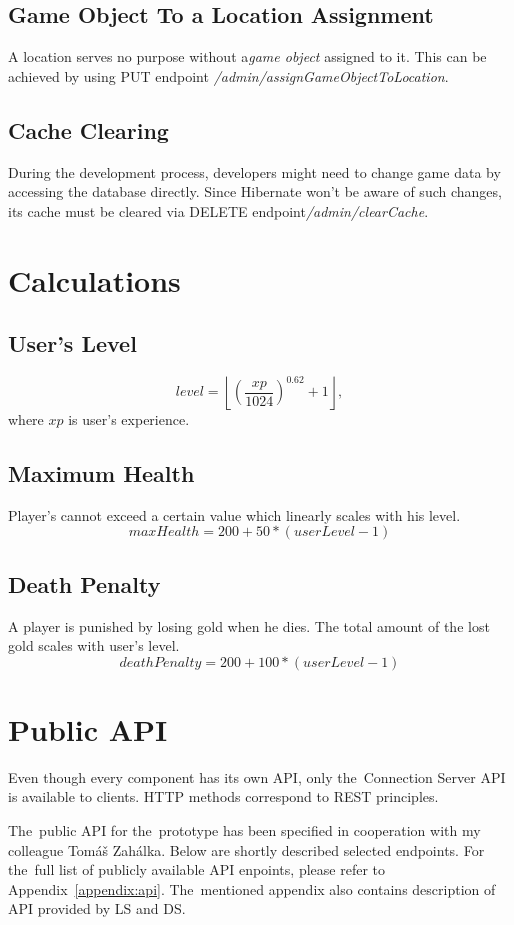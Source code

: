 	\subsection{Game Object To a Location Assignment}
	A location serves no purpose without a\textit{game object} assigned to it. This can be achieved by using PUT endpoint \mbox{\textit{/admin/assignGameObjectToLocation}}.
	
	\subsection{Cache Clearing}
	During the development process, developers might need to change game data by accessing the database directly. Since Hibernate won't be aware of such changes, its cache must be cleared via DELETE endpoint\mbox{\textit{/admin/clearCache}}.

\section{Calculations}
	\subsection{User's Level}
	\[ level = \left\lfloor{\left(\frac{xp}{1024}\right)^{0.62} + 1}\right\rfloor, \]
	where $xp$ is user's experience.
	\subsection{Maximum Health}
	Player's cannot exceed a certain value which linearly scales with his level.
	\[ maxHealth = 200 + 50 * (userLevel - 1) \]
	
	\subsection{Death Penalty}
	A player is punished by losing gold when he dies. The total amount of the lost gold scales with user's level.
	\[ deathPenalty = 200 + 100 * (userLevel - 1) \]

\section{Public API}
Even though every component has its own API, only the~Connection Server API is available to clients. HTTP methods correspond to REST principles.

The~public API for the~prototype has been specified in cooperation with my colleague Tomáš Zahálka. Below are shortly described selected endpoints. For the~full list of publicly available API enpoints, please refer to Appendix~\ref{appendix:api}. The~mentioned appendix also contains description of API provided by LS and DS. 	


